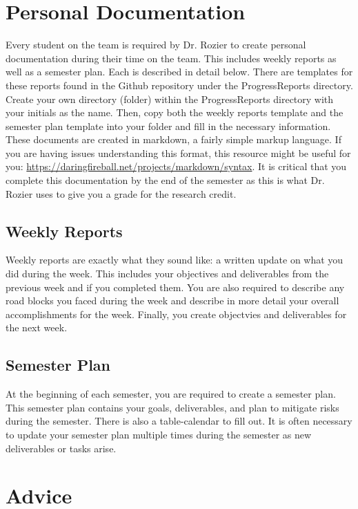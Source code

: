 \documentclass{article}
\begin{document}
\section{Personal Documentation}
Every student on the team is required by Dr. Rozier to create personal documentation during their time on the team. This includes weekly reports as well as a semester plan. Each is described in detail below. There are templates for these reports found in the Github repository under the ProgressReports directory. Create your own directory (folder) within the ProgressReports directory with your initials as the name. Then, copy both the weekly reports template and the semester plan template into your folder and fill in the necessary information. These documents are created in markdown, a fairly simple markup language. If you are having issues understanding this format, this resource might be useful for you: \url{https://daringfireball.net/projects/markdown/syntax}. It is critical that you complete this documentation by the end of the semester as this is what Dr. Rozier uses to give you a grade for the research credit. 

\subsection{Weekly Reports}
Weekly reports are exactly what they sound like: a written update on what you did during the week. This includes your objectives and deliverables from the previous week and if you completed them. You are also required to describe any road blocks you faced during the week and describe in more detail your overall accomplishments for the week. Finally, you create objectvies and deliverables for the next week. 

\subsection{Semester Plan}
At the beginning of each semester, you are required to create a semester plan. This semester plan contains your goals, deliverables, and plan to mitigate risks during the semester. There is also a table-calendar to fill out. It is often necessary to update your semester plan multiple times during the semester as new deliverables or tasks arise. 

\section{Advice}
\end{document}
